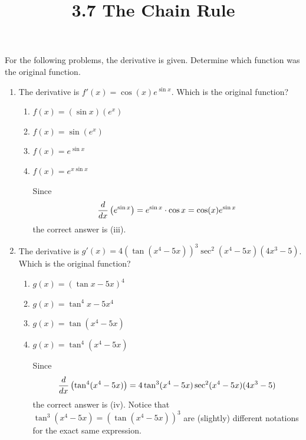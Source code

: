 \documentclass[nooutcomes,handout]{ximera}
\title{3.7 The Chain Rule}
\begin{document}
\begin{abstract}		\end{abstract}
\maketitle

\begin{problem}
For the following problems, the derivative is given.  Determine which function was the original function.
	\begin{enumerate}
	
		\item  The derivative is $f'(x) = \cos (x) e^{\sin x}$.  Which is the original function?
		
			\begin{enumerate}
			
			\item  $f(x) = (\sin x)(e^x)$
			\item  $f(x) = \sin (e^x)$
			\item  $f(x) = e^{\sin x}$
			\item  $f(x) = e^{x \sin x}$
			
				\begin{freeResponse}
				Since
				$$ \frac{d}{dx} \left( e^{\sin x} \right) = e^{\sin x} \cdot \cos x = \cos(x) e^{\sin x} $$
				the correct answer is (iii).  
				\end{freeResponse}
				
			\end{enumerate}
			
			
			
		\item  The derivative is $g'(x) = 4 \left( \tan (x^4 - 5x) \right)^3 \sec^2(x^4-5x)(4x^3-5)$.  Which is the original function?
		
			\begin{enumerate}
			
			\item  $g(x) = \left( \tan x - 5x \right)^4$
			\item  $g(x) = \tan^4x - 5x^4$
			\item  $g(x) = \tan(x^4 - 5x)$
			\item  $g(x) = \tan^4(x^4-5x)$
			
				\begin{freeResponse}
				Since 
				$$\frac{d}{dx} \left( \tan^4(x^4-5x) \right) = 4 \tan^3(x^4-5x) \sec^2(x^4-5x) (4x^3-5)$$ 
				the correct answer is (iv).  Notice that $\tan^3(x^4-5x) = \left( \tan(x^4-5x) \right)^3$ are (slightly) different notations for the exact same expression.
				\end{freeResponse}
				
			\end{enumerate}
			
	\end{enumerate}
\end{problem}	
	
\end{document}
